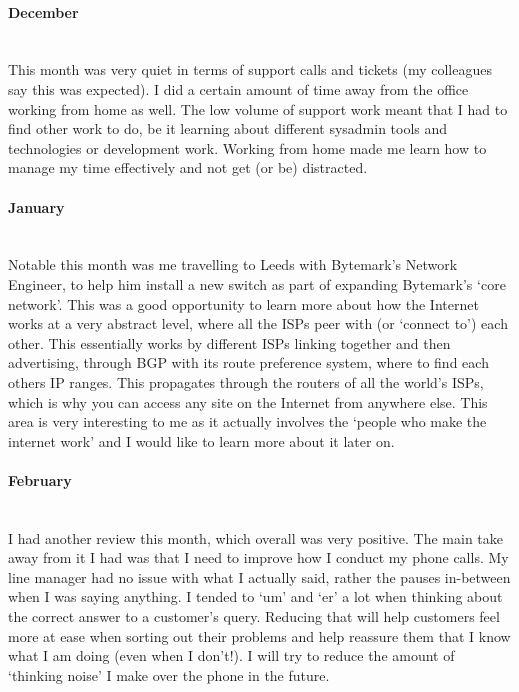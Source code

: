\documentclass[12pt,a4paper]{article}
\newcommand{\paragraphnl}[1]{\paragraph{#1}\mbox{}\\}
\begin{document}
\paragraphnl{December}
	This month was very quiet in terms of support calls and tickets (my
	colleagues say this was expected). I did a certain amount of time away from
	the office working from home as well. The low volume of support work meant
	that I had to find other work to do, be it learning about different sysadmin
	tools and technologies or development work. Working from home made me learn
	how to manage my time effectively and not get (or be) distracted.

\paragraphnl{January}
	Notable this month was me travelling to Leeds with Bytemark's Network
	Engineer, to help him install a new switch as part of expanding Bytemark's
	`core network'. This was a good opportunity to learn more about how the
	Internet works at a very abstract level, where all the ISPs peer with (or
	`connect to') each other. This essentially works by different ISPs linking
	together and then advertising, through BGP with its route preference system,
	where to find each others IP ranges. This propagates through the routers of
	all the world's ISPs, which is why you can access any site on the Internet
	from anywhere else. This area is very interesting to me as it actually
	involves the `people who make the internet work' and I would like to learn
	more about it later on.

\paragraphnl{February}
	I had another review this month, which overall was very positive. The main
	take away from it I had was that I need to improve how I conduct my phone
	calls. My line manager had no issue with what I actually said, rather the
	pauses in-between when I was saying anything. I tended to `um' and `er' a
	lot when thinking about the correct answer to a customer's query. Reducing
	that will help customers feel more at ease when sorting out their problems
	and help reassure them that I know what I am doing (even when I don't!). I
	will try to reduce the amount of `thinking noise' I make over the phone in
	the future.
\end{document}
